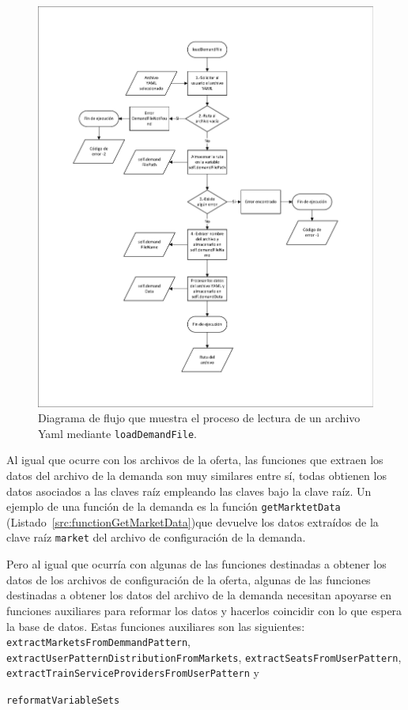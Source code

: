 \begin{figure}[htbp]
\centering
\includegraphics[width=.92\textwidth]{fig/Diagramas de flujo/loadDemandFile.pdf}
\caption{Diagrama de flujo que muestra el proceso de lectura de un archivo \acrshort{Yaml} mediante \texttt{loadDemandFile}.}
\label{fig:DiagramaFlujoLoadDemandFile}
\end{figure}

Al igual que ocurre con los archivos de la oferta, las funciones que extraen los datos del archivo de la demanda son muy similares entre sí, todas obtienen los datos asociados a las claves raíz empleando las claves bajo la clave raíz. Un ejemplo de una función de la demanda es la función \texttt{getMarktetData} (Listado~\ref{src:functionGetMarketData})que devuelve los datos extraídos de la clave raíz \texttt{market} del archivo de configuración de la demanda.

Pero al igual que ocurría con algunas de las funciones destinadas a obtener los datos de los archivos de configuración de la oferta, algunas de las funciones destinadas a obtener los datos del archivo de la demanda necesitan apoyarse en funciones auxiliares para reformar los datos y hacerlos coincidir con lo que espera la base de datos. Estas funciones auxiliares son las siguientes: \texttt{extractMarketsFromDemmandPattern}, \texttt{extractUserPatternDistributionFromMarkets}, \texttt{extractSeatsFromUserPattern}, \texttt{extractTrainServiceProvidersFromUserPattern} y \parbox{\linewidth}{\texttt{reformatVariableSets}}

